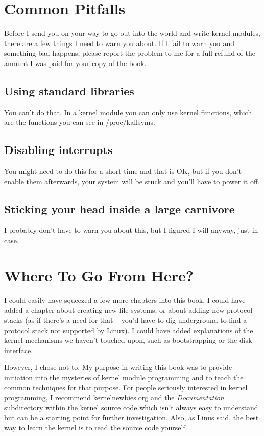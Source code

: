 \documentclass[11pt]{article}
\begin{document}
\section*{Common Pitfalls}
\label{sec:orgb453ee2}
Before I send you on your way to go out into the world and write kernel modules, there are a few things I need to warn you about. If I fail to warn you and something bad happens, please report the problem to me for a full refund of the amount I was paid for your copy of the book.

\subsection*{Using standard libraries}
\label{sec:org468618b}
You can't do that. In a kernel module you can only use kernel functions, which are the functions you can see in /proc/kallsyms.

\subsection*{Disabling interrupts}
\label{sec:org2ed2867}
You might need to do this for a short time and that is OK, but if you don't enable them afterwards, your system will be stuck and you'll have to power it off.

\subsection*{Sticking your head inside a large carnivore}
\label{sec:org0aecc68}
I probably don't have to warn you about this, but I figured I will anyway, just in case.

\section*{Where To Go From Here?}
\label{sec:orgaf2b21d}
I could easily have squeezed a few more chapters into this book. I could have added a chapter about creating new file systems, or about adding new protocol stacks (as if there's a need for that -- you'd have to dig underground to find a protocol stack not supported by Linux). I could have added explanations of the kernel mechanisms we haven't touched upon, such as bootstrapping or the disk interface.

However, I chose not to. My purpose in writing this book was to provide initiation into the mysteries of kernel module programming and to teach the common techniques for that purpose. For people seriously interested in kernel programming, I recommend \href{https://kernelnewbies.org}{kernelnewbies.org} and the \emph{Documentation} subdirectory within the kernel source code which isn't always easy to understand but can be a starting point for further investigation. Also, as Linus said, the best way to learn the kernel is to read the source code yourself.
\end{document}
